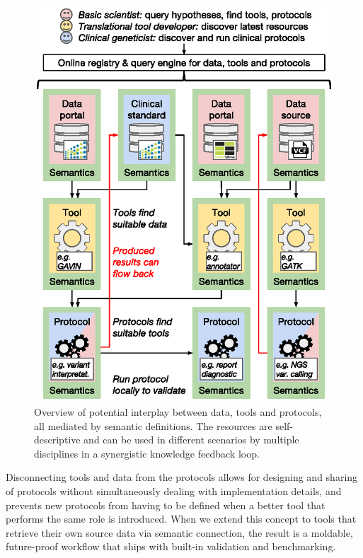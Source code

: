 \begin{figure}
\centering
\includegraphics[scale=0.9]{img/discussion_futurevision}
\caption[Interplay between data, tools and protocols]{Overview of potential interplay between data, tools and protocols, all mediated by semantic definitions. The resources are self-descriptive and can be used in different scenarios by multiple disciplines in a synergistic knowledge feedback loop.}
\label{fig:discussion_futurevision}
\end{figure}

Disconnecting tools and data from the protocols allows for designing and sharing of protocols without simultaneously dealing with implementation details, and prevents new protocols from having to be defined when a better tool that performs the same role is introduced.
When we extend this concept to tools that retrieve their own source data via semantic connection, the result is a moldable, future-proof workflow that ships with built-in validation and benchmarking.

